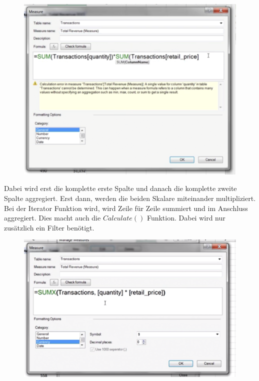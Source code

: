 \begin{figure}[H]
	\centering
	\includegraphics[scale = 0.3]{attachment/chapter_1/screenshot106}
	\caption{}
	\label{fig:screenshot106}
\end{figure} 
Dabei wird erst die komplette erste Spalte und danach die komplette zweite Spalte aggregiert. Erst dann, werden die beiden Skalare miteinander multipliziert. Bei der Iterator Funktion wird, wird Zeile für Zeile summiert und im Anschluss aggregiert. Dies macht auch die $Calculate()$ Funktion. Dabei wird nur zusätzlich ein Filter benötigt. 

\begin{figure}[H]
	\centering
	\includegraphics[scale = 0.3]{attachment/chapter_1/screenshot107}
	\caption{}
	\label{fig:screenshot107}
\end{figure} 

